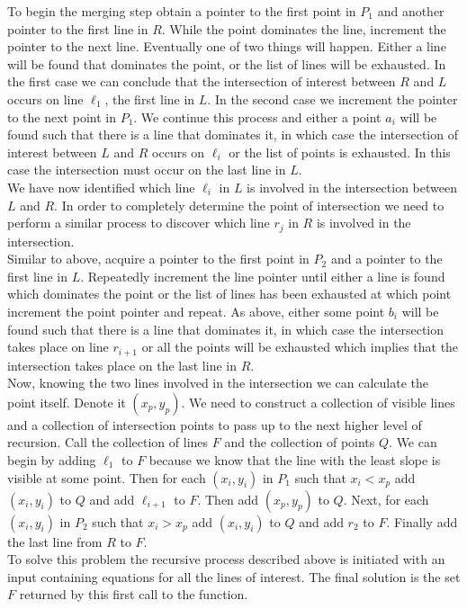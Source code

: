 \documentclass{article}
\begin{document}
To begin the merging step obtain a pointer to the first point in $P_1$ and another pointer to the first line in $R$. While the point dominates the line, increment the pointer to the next line. Eventually one of two things will happen. Either a line will be found that dominates the point, or the list of lines will be exhausted. In the first case we can conclude that the intersection of interest between $R$ and $L$ occurs on line $\ell_1$, the first line in $L$. In the second case we increment the pointer to the next point in $P_1$. We continue this process and either a point $a_i$ will be found such that there is a line that dominates it, in which case the intersection of interest between $L$ and $R$ occurs on $\ell_i$ or the list of points is exhausted. In this case the intersection must occur on the last line in $L$.\\

We have now identified which line $\ell_i$ in $L$ is involved in the intersection between $L$ and $R$. In order to completely determine the point of intersection we need to perform a similar process to discover which line $r_j$ in $R$ is involved in the intersection.\\

Similar to above, acquire a pointer to the first point in $P_2$ and a pointer to the first line in $L$. Repeatedly increment the line pointer until either a line is found which dominates the point or the list of lines has been exhausted at which point increment the point pointer and repeat. As above, either some point $b_i$ will be found such that there is a line that dominates it, in which case the intersection takes place on line $r_{i+1}$ or all the points will be exhausted which implies that the intersection takes place on the last line in $R$.\\

Now, knowing the two lines involved in the intersection we can calculate the point itself. Denote it $(x_p, y_p)$. We need to construct a collection of visible lines and a collection of intersection points to pass up to the next higher level of recursion. Call the collection of lines $F$ and the collection of points $Q$. We can begin by adding $\ell_1$ to $F$ because we know that the line with the least slope is visible at some point. Then for each $(x_i, y_i)$ in $P_1$ such that $x_i < x_p$ add $(x_i, y_i)$ to $Q$ and add $\ell_{i+1}$ to $F$. Then add $(x_p, y_p)$ to $Q$. Next, for each $(x_i, y_i)$ in $P_2$ such that $x_i > x_p$ add $(x_i, y_i)$ to $Q$ and add $r_2$ to $F$. Finally add the last line from $R$ to $F$.\\

To solve this problem the recursive process described above is initiated with an input containing equations for all the lines of interest. The final solution is the set $F$ returned by this first call to the function.
\end{document}
